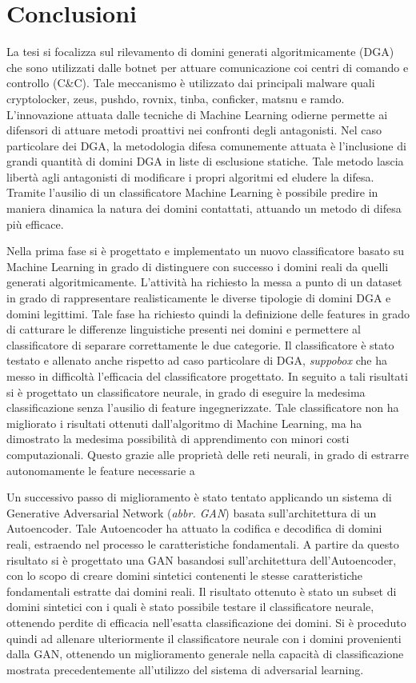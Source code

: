 \chapter{Conclusioni}
\label{conclusioni}
La tesi si focalizza sul rilevamento di domini generati algoritmicamente (DGA) che sono utilizzati dalle botnet per attuare comunicazione coi centri di comando e controllo (C\&C). Tale meccanismo è utilizzato dai principali malware quali cryptolocker, zeus, pushdo, rovnix, tinba, conficker, matsnu e ramdo. L'innovazione attuata dalle tecniche di Machine Learning odierne permette ai difensori di attuare metodi proattivi nei confronti degli antagonisti. Nel caso particolare dei DGA, la metodologia difesa comunemente attuata è l'inclusione di grandi quantità di domini DGA in liste di esclusione statiche. Tale metodo lascia libertà agli antagonisti di modificare i propri algoritmi ed eludere la difesa. Tramite l'ausilio di un classificatore Machine Learning è possibile predire in maniera dinamica la natura dei domini contattati, attuando un metodo di difesa più efficace.

Nella prima fase si è progettato e implementato un nuovo classificatore basato su Machine Learning in grado di distinguere con successo i domini reali da quelli generati algoritmicamente. L'attività ha richiesto la messa a punto di un dataset in grado di rappresentare realisticamente le diverse tipologie di domini DGA e domini legittimi. Tale fase ha richiesto quindi la definizione delle features in grado di catturare le differenze linguistiche presenti nei domini e permettere al classificatore di separare correttamente le due categorie. Il classificatore è stato testato e allenato anche rispetto ad caso particolare di DGA, \textit{suppobox} che ha messo in difficoltà l'efficacia del classificatore progettato. In seguito a tali risultati si è progettato un classificatore neurale, in grado di eseguire la medesima classificazione senza l'ausilio di feature ingegnerizzate. Tale classificatore non ha migliorato i risultati ottenuti dall'algoritmo di Machine Learning, ma ha dimostrato la medesima possibilità di apprendimento con minori costi computazionali. Questo grazie alle proprietà delle reti neurali, in grado di estrarre autonomamente le feature necessarie a

Un successivo passo di miglioramento è stato tentato applicando un sistema di Generative Adversarial Network (\textit{abbr. GAN}) basata sull'architettura di un Autoencoder. Tale Autoencoder ha attuato la codifica e decodifica di domini reali, estraendo nel processo le caratteristiche fondamentali. A partire da questo risultato si è progettato una GAN basandosi sull'architettura dell'Autoencoder, con lo scopo di creare domini sintetici contenenti le stesse caratteristiche fondamentali estratte dai domini reali. Il risultato ottenuto è stato un subset di domini sintetici con i quali è stato possibile testare il classificatore neurale, ottenendo perdite di efficacia nell'esatta classificazione dei domini. Si è proceduto quindi ad allenare ulteriormente il classificatore neurale con i domini provenienti dalla GAN, ottenendo un miglioramento generale nella capacità di classificazione mostrata precedentemente all'utilizzo del sistema di adversarial learning.

